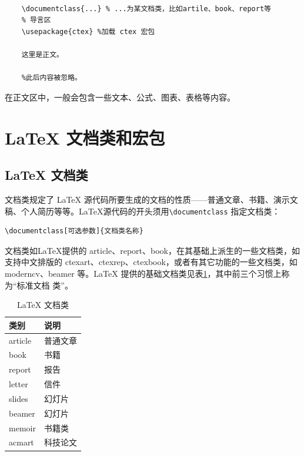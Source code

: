 \begin{lstlisting}

    \documentclass{...} % ...为某文档类，比如artile、book、report等
    % 导言区 
    \usepackage{ctex} %加载 ctex 宏包
    
    这里是正文。
    
    %此后内容被忽略。

\end{lstlisting}

在正文区中，一般会包含一些文本、公式、图表、表格等内容。

\section{\LaTeX{} 文档类和宏包}\label{sec:latexclasses}
\subsection{\LaTeX{} 文档类}\label{subsec:latexdocclass}
文档类规定了 \LaTeX{} 源代码所要生成的文档的性质——普通文章、书籍、演示文稿、个人简历等等。\LaTeX{}源代码的开头须用\lstinline{\documentclass} 指定文档类：

\begin{lstlisting}
\documentclass[可选参数]{文档类名称}
\end{lstlisting}

文档类如\LaTeX{}提供的 article、report、book，在其基础上派生的一些文档类，如支持中文排版的 ctexart、ctexrep、ctexbook，或者有其它功能的一些文档类，如 moderncv、beamer 等。\LaTeX{} 提供的基础文档类见表\ref{tab:latex_doc_class}，其中前三个习惯上称为“标准文档
类”。

\begin{table}[!h]
    \centering
    \caption{\LaTeX{} 文档类}
    \label{tab:latex_doc_class}
    \begin{tabular}{ll}
        \toprule
        类别      & 说明   \\
        \midrule
        article & 普通文章 \\
        book    & 书籍   \\
        report  & 报告   \\
        \hline
        letter  & 信件   \\
        slides  & 幻灯片  \\
        beamer  & 幻灯片  \\
        memoir  & 书籍类  \\
        acmart  & 科技论文 \\
        \bottomrule
    \end{tabular}
\end{table}

